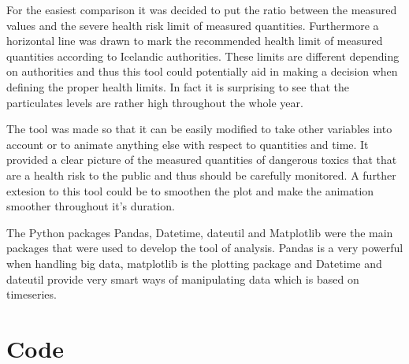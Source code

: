 \documentclass[12pt, a4paper]{article}
\begin{document}
For the easiest comparison it was decided to put the ratio between the measured values and the severe health risk limit of measured quantities. 
Furthermore a horizontal line was drawn to mark the recommended health limit of measured quantities according to Icelandic authorities. 
These limits are different depending on authorities and thus this tool could potentially aid in making a decision when defining the proper health limits.
In fact it is surprising to see that the particulates levels are rather high throughout the whole year.


The tool was made so that it can be easily modified to take other variables into account or to animate anything else with respect to quantities and time. 
It provided a clear picture of the measured quantities of dangerous toxics that that are a health risk to the public and thus should be carefully monitored.
A further extesion to this tool could be to smoothen the plot and make the animation smoother throughout it's duration.


The Python packages Pandas, Datetime, dateutil and Matplotlib were the main packages that were used to develop the tool of analysis. Pandas is a very powerful when handling big data, matplotlib is the plotting package and
Datetime and dateutil provide very smart ways of manipulating data which is based on timeseries.




\pagebreak
\section{Code}


\pagebreak
\end{document}
